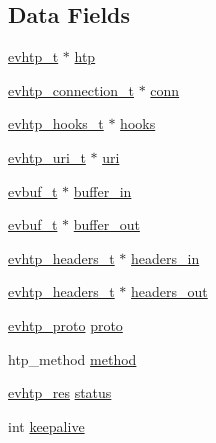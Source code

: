 \subsection*{\-Data \-Fields}
\begin{DoxyCompactItemize}
\item 
\hyperlink{evhtp_8h_aa670c92d77f9a732e03a7d48ada2b31b}{evhtp\-\_\-t} $\ast$ \hyperlink{structevhtp__request__s_ad2f5cc5c9e97f75f1fe923c57af9e875}{htp}
\item 
\hyperlink{evhtp_8h_aa51ddee7192d35f0f586d85d7e555891}{evhtp\-\_\-connection\-\_\-t} $\ast$ \hyperlink{structevhtp__request__s_a313e4d80c47517f02f2fe99e8840c280}{conn}
\item 
\hyperlink{evhtp_8h_ac77d779459ec62f309d1fb09c5540786}{evhtp\-\_\-hooks\-\_\-t} $\ast$ \hyperlink{structevhtp__request__s_ac97663394f74c9030e57c771cfb7981e}{hooks}
\item 
\hyperlink{evhtp_8h_a5057cdb41a47631dd5672cbc1b59bcf8}{evhtp\-\_\-uri\-\_\-t} $\ast$ \hyperlink{structevhtp__request__s_adfdac9f1ecf15761c62699a52d855a49}{uri}
\item 
\hyperlink{evhtp_8h_a7c30b85cd8bba6ebbfe58c3fc81139c8}{evbuf\-\_\-t} $\ast$ \hyperlink{structevhtp__request__s_ad9e8b203574b6c44296b23b897206768}{buffer\-\_\-in}
\item 
\hyperlink{evhtp_8h_a7c30b85cd8bba6ebbfe58c3fc81139c8}{evbuf\-\_\-t} $\ast$ \hyperlink{structevhtp__request__s_aa2a97cf41f1776b60c84e31eb6778d05}{buffer\-\_\-out}
\item 
\hyperlink{evhtp_8h_a39e4a3adac2cba0714b1f6c77311f868}{evhtp\-\_\-headers\-\_\-t} $\ast$ \hyperlink{structevhtp__request__s_a231fb5c9d95add6d73b4500233a98de8}{headers\-\_\-in}
\item 
\hyperlink{evhtp_8h_a39e4a3adac2cba0714b1f6c77311f868}{evhtp\-\_\-headers\-\_\-t} $\ast$ \hyperlink{structevhtp__request__s_a139e220680f914ac7a44f3dac1b34be0}{headers\-\_\-out}
\item 
\hyperlink{evhtp_8h_ac3df0cb2556f57ad0bc8bb44ae126da5}{evhtp\-\_\-proto} \hyperlink{structevhtp__request__s_a3acae974abf6e95063cab796fbe2a7f6}{proto}
\item 
htp\-\_\-method \hyperlink{structevhtp__request__s_a5322aefd6f774a31c7cbfaeee0d3a417}{method}
\item 
\hyperlink{evhtp_8h_ac6ada2a29bcb7a7ddcfdcabc0d37022a}{evhtp\-\_\-res} \hyperlink{structevhtp__request__s_a9342eb644f9122b975cf9e2aed3cc00c}{status}
\item 
int \hyperlink{structevhtp__request__s_ae314c4b48027be9feab52906b6313b73}{keepalive}

\end{DoxyCompactItemize}
